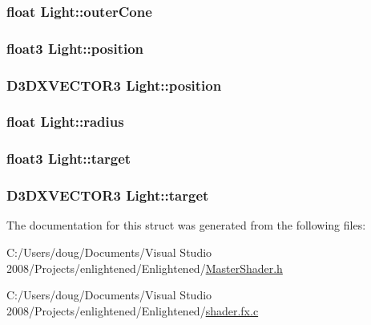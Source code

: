 \label{struct_light_a986bc50635faf4f74e51ebdb52354e30}
\hypertarget{struct_light_a0badad92b7b4cf0115f0f7e2f30ab11d}{
\subsubsection[{outerCone}]{\setlength{\rightskip}{0pt plus 5cm}float {\bf Light::outerCone}}}
\label{struct_light_a0badad92b7b4cf0115f0f7e2f30ab11d}
\hypertarget{struct_light_a3db75a1b23b53fbd4d98da10dda1d52f}{
\subsubsection[{position}]{\setlength{\rightskip}{0pt plus 5cm}float3 {\bf Light::position}}}
\label{struct_light_a3db75a1b23b53fbd4d98da10dda1d52f}
\hypertarget{struct_light_ab44cc66400fc65c319f551330e18c8e9}{
\subsubsection[{position}]{\setlength{\rightskip}{0pt plus 5cm}D3DXVECTOR3 {\bf Light::position}}}
\label{struct_light_ab44cc66400fc65c319f551330e18c8e9}
\hypertarget{struct_light_ab9a87981b02f4612c872c49efa6b6e53}{
\subsubsection[{radius}]{\setlength{\rightskip}{0pt plus 5cm}float {\bf Light::radius}}}
\label{struct_light_ab9a87981b02f4612c872c49efa6b6e53}
\hypertarget{struct_light_ac7a0d5eed7975a29294ba1ff61fb75e4}{
\subsubsection[{target}]{\setlength{\rightskip}{0pt plus 5cm}float3 {\bf Light::target}}}
\label{struct_light_ac7a0d5eed7975a29294ba1ff61fb75e4}
\hypertarget{struct_light_a6b5f6eaeab5d0d4043db3048aaaf7d2e}{
\subsubsection[{target}]{\setlength{\rightskip}{0pt plus 5cm}D3DXVECTOR3 {\bf Light::target}}}
\label{struct_light_a6b5f6eaeab5d0d4043db3048aaaf7d2e}


The documentation for this struct was generated from the following files:\begin{DoxyCompactItemize}
\item 
C:/Users/doug/Documents/Visual Studio 2008/Projects/enlightened/Enlightened/\hyperlink{_master_shader_8h}{MasterShader.h}\item 
C:/Users/doug/Documents/Visual Studio 2008/Projects/enlightened/Enlightened/\hyperlink{shader_8fx_8c}{shader.fx.c}\end{DoxyCompactItemize}
